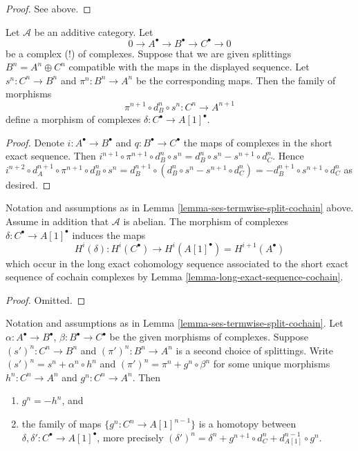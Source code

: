 \begin{proof}
See above.
\end{proof}

\begin{lemma}
\label{lemma-ses-termwise-split-cochain}
Let $\mathcal{A}$ be an additive category.
Let
$$
0 \to A^\bullet \to B^\bullet \to C^\bullet \to 0
$$
be a complex (!) of complexes.
Suppose that we are given splittings $B^n = A^n \oplus C^n$
compatible with the maps in the displayed sequence.
Let $s^n : C^n \to B^n$ and $\pi^n : B^n \to A^n$ be the
corresponding maps. Then the family of morphisms
$$
\pi^{n + 1} \circ d_B^n \circ s^n
:
C^n \to A^{n + 1}
$$
define a morphism of complexes $\delta : C^\bullet \to A[1]^\bullet$.
\end{lemma}

\begin{proof}
Denote $i : A^\bullet \to B^\bullet$ and $q : B^\bullet \to C^\bullet$
the maps of complexes in the short exact sequence. Then
$i^{n + 1} \circ \pi^{n + 1} \circ d_B^n \circ s^n =
d_B^n \circ s^n - s^{n + 1} \circ d_C^n$. Hence
$i^{n + 2} \circ d_A^{n + 1} \circ \pi^{n + 1} \circ d_B^n \circ s^n =
d_B^{n + 1} \circ (d_B^n \circ s^n - s^{n + 1} \circ d_C^n) =
- d_B^{n + 1} \circ s^{n + 1} \circ d_C^n$ as desired.
\end{proof}

\begin{lemma}
\label{lemma-ses-termwise-split-long-cochain}
Notation and assumptions as in
Lemma \ref{lemma-ses-termwise-split-cochain} above.
Assume in addition that $\mathcal{A}$ is abelian.
The morphism of complexes $\delta : C^\bullet \to A[1]^\bullet$
induces the maps
$$
H^i(\delta) :
H^i(C^\bullet) \longrightarrow H^i(A[1]^\bullet) = H^{i + 1}(A^\bullet)
$$
which occur in the long exact cohomology sequence associated
to the short exact sequence of cochain complexes by
Lemma \ref{lemma-long-exact-sequence-cochain}.
\end{lemma}

\begin{proof}
Omitted.
\end{proof}

\begin{lemma}
\label{lemma-ses-termwise-split-homotopy-cochain}
Notation and assumptions as in
Lemma \ref{lemma-ses-termwise-split-cochain}.
Let $\alpha : A^\bullet \to B^\bullet$,
$\beta : B^\bullet \to C^\bullet$ be the given
morphisms of complexes.
Suppose $(s')^n : C^n \to B^n$ and $(\pi')^n : B^n \to A^n$
is a second choice of splittings.
Write $(s')^n = s^n + \alpha^n \circ h^n$ and
$(\pi')^n = \pi^n + g^n \circ \beta^n$ for some unique
morphisms $h^n : C^n \to A^n$ and $g^n : C^n \to A^n$. Then
\begin{enumerate}
\item $g^n = - h^n$, and
\item the family of maps $\{g^n : C^n \to A[1]^{n - 1}\}$ is a homotopy
between $\delta, \delta' : C^\bullet \to A[1]^\bullet$, more precisely
$(\delta')^n = \delta^n + g^{n + 1} \circ d_C^n + d_{A[1]}^{n - 1} \circ g^n$.
\end{enumerate}
\end{lemma}

